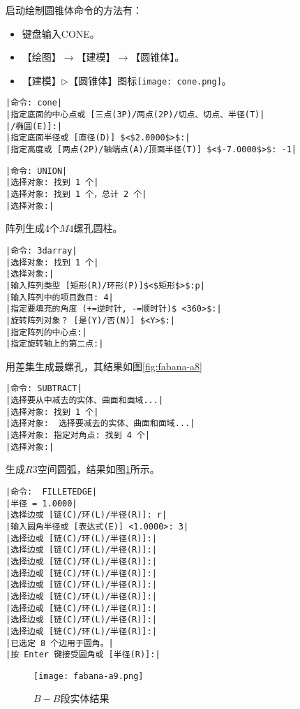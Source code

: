 \begin{procedure}
启动绘制圆锥体命令的方法有：
\begin{itemize}
\item 键盘输入CONE。
\item 【绘图】$\rightarrow$【建模】$\rightarrow$【圆锥体】。
\item 【建模】$\triangleright$【圆锥体】图标\texttt{[image: cone.png]}。
\end{itemize}
\begin{lstlisting}
|命令: cone|
|指定底面的中心点或 [三点(3P)/两点(2P)/切点、切点、半径(T)|
|/椭圆(E)]:|
|指定底面半径或 [直径(D)] $<$2.0000$>$:|
|指定高度或 [两点(2P)/轴端点(A)/顶面半径(T)] $<$-7.0000$>$: -1|
\end{lstlisting}
\begin{lstlisting}
|命令: UNION|
|选择对象: 找到 1 个|
|选择对象: 找到 1 个，总计 2 个|
|选择对象:|
\end{lstlisting}
\item 阵列生成4个$M4$螺孔圆柱。
\begin{lstlisting}
|命令: 3darray|
|选择对象: 找到 1 个|
|选择对象:|
|输入阵列类型 [矩形(R)/环形(P)]$<$矩形$>$:p|
|输入阵列中的项目数目: 4|
|指定要填充的角度 (+=逆时针, -=顺时针)$ <360>$:|
|旋转阵列对象？ [是(Y)/否(N)] $<Y>$:|
|指定阵列的中心点:|
|指定旋转轴上的第二点:|
\end{lstlisting}
\newpage
用差集生成最螺孔，其结果如图\ref{fig:fabana-a8}
\begin{lstlisting}
|命令: SUBTRACT|
|选择要从中减去的实体、曲面和面域...|
|选择对象: 找到 1 个|
|选择对象:  选择要减去的实体、曲面和面域...|
|选择对象: 指定对角点: 找到 4 个|
|选择对象:|
\end{lstlisting}
\item 生成$R3$空间圆弧，结果如图\ref{fig:fabana-a9}所示。
\begin{lstlisting}
|命令:  FILLETEDGE|
|半径 = 1.0000|
|选择边或 [链(C)/环(L)/半径(R)]: r|
|输入圆角半径或 [表达式(E)] <1.0000>: 3|
|选择边或 [链(C)/环(L)/半径(R)]:|
|选择边或 [链(C)/环(L)/半径(R)]:|
|选择边或 [链(C)/环(L)/半径(R)]:|
|选择边或 [链(C)/环(L)/半径(R)]:|
|选择边或 [链(C)/环(L)/半径(R)]:|
|选择边或 [链(C)/环(L)/半径(R)]:|
|选择边或 [链(C)/环(L)/半径(R)]:|
|选择边或 [链(C)/环(L)/半径(R)]:|
|选择边或 [链(C)/环(L)/半径(R)]:|
|已选定 8 个边用于圆角。|
|按 Enter 键接受圆角或 [半径(R)]:|
\end{lstlisting}
\begin{figure}[htbp]
\texttt{[image: fabana-a9.png]}
\caption{$B-B$段实体结果}\label{fig:fabana-a9}
\end{figure}
\end{procedure}
\endinput
